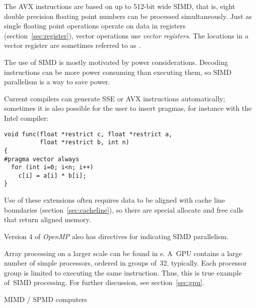 The \ac{AVX} instructions are based on up to
512-bit wide SIMD, that is,
eight double precision floating point numbers can be
processed simultaneously. Just as single floating point operations
operate on data in registers (section~\ref{sec:register}),
vector operations use \emph{vector registers}.
The locations in a vector register are sometimes referred to as .

The use of SIMD is mostly
motivated by power considerations.
Decoding instructions can be
more power consuming than executing them, so SIMD parallelism is a way
to save power.

Current compilers can generate \ac{SSE} or \ac{AVX}
instructions automatically;
sometimes it is also possible for the user to insert pragmas, for
instance with the Intel compiler:
\begin{verbatim}
void func(float *restrict c, float *restrict a,
          float *restrict b, int n)
{
#pragma vector always
  for (int i=0; i<n; i++)
    c[i] = a[i] * b[i];
}
\end{verbatim}
Use of these extensions often requires data to be aligned with cache
line boundaries (section~\ref{sec:cacheline}), so there are special
allocate and free calls that return aligned memory.

Version 4 of \emph{OpenMP} also has directives for indicating SIMD parallelism.

\begin{comment}
For a nontrivial example, see figure~\ref{fig:SSEcomplexmult}, which
describes complex multiplication using SSE3.
\begin{figure}[ht]
  \begin{quote}
  \texttt{[image: complexmult]}
  \end{quote}
  \caption{Complex multiplication with SSE3.}
  \label{fig:SSEcomplexmult}
\end{figure}
\end{comment}

Array processing on a larger scale can be found in
s. A~\ac{GPU} contains a large number of simple
processors, ordered in groups of~32, typically. Each processor group
is limited to executing the same instruction. Thus, this is true
example of~\ac{SIMD} processing.
For further discussion, see section~\ref{sec:gpu}.

 {MIMD / SPMD computers}
\label{sec:mimd}\label{sec:spmd}

